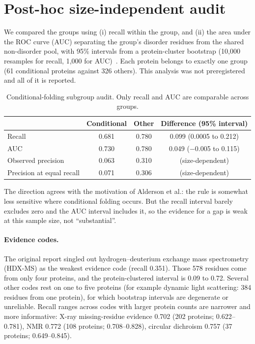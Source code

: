 \documentclass[11pt]{article}
\begin{document}
\section{Post-hoc size-independent audit}
We compared the groups using (i) recall within the group, and (ii) the area under the ROC curve (AUC) separating the
group's disorder residues from the shared non-disorder pool, with 95\% intervals from a protein-cluster bootstrap
(10{,}000 resamples for recall, 1{,}000 for AUC)~\cite{field2007}. Each protein belongs to exactly one group (61
conditional proteins against 326 others). This analysis was not preregistered and all of it is reported.
\begin{table}[h]
\centering\small
\begin{tabular}{lccc}
\toprule
 & Conditional & Other & Difference (95\% interval)\\
\midrule
Recall & 0.681 & 0.780 & 0.099 (0.0005 to 0.212)\\
AUC & 0.730 & 0.780 & 0.049 ($-$0.005 to 0.115)\\
Observed precision & 0.063 & 0.310 & (size-dependent)\\
Precision at equal recall & 0.071 & 0.306 & (size-dependent)\\
\bottomrule
\end{tabular}
\caption{Conditional-folding subgroup audit. Only recall and AUC are comparable across groups.}
\end{table}
The direction agrees with the motivation of Alderson et al.: the rule is somewhat less sensitive where conditional
folding occurs. But the recall interval barely excludes zero and the AUC interval includes it, so the evidence for a
gap is weak at this sample size, not ``substantial''.

\paragraph{Evidence codes.}
The original report singled out hydrogen--deuterium exchange mass spectrometry (HDX-MS) as the weakest evidence code
(recall 0.351). Those 578 residues come from only four proteins, and the protein-clustered interval is 0.09 to 0.72.
Several other codes rest on one to five proteins (for example dynamic light scattering: 384 residues from one protein), for
which bootstrap intervals are degenerate or unreliable. Recall ranges across codes with larger protein counts are
narrower and more informative: X-ray missing-residue evidence 0.702 (202 proteins; 0.622--0.781), NMR 0.772
(108 proteins; 0.708--0.828), circular dichroism 0.757 (37 proteins; 0.649--0.845).
\end{document}

